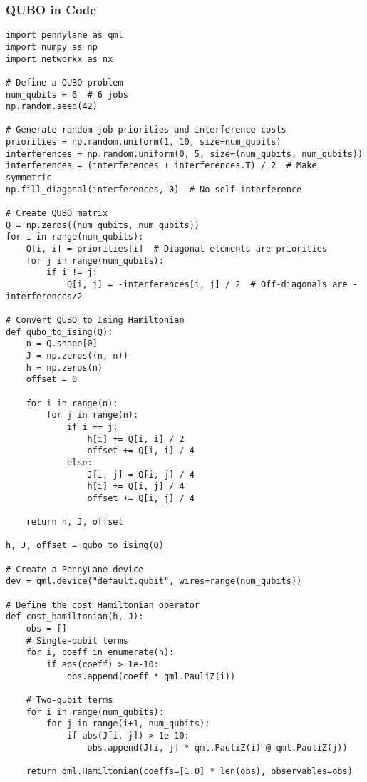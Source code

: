 \vspace{0.3cm}

\subsubsection*{QUBO in Code}

\begin{verbatim}
import pennylane as qml
import numpy as np
import networkx as nx

# Define a QUBO problem
num_qubits = 6  # 6 jobs
np.random.seed(42)

# Generate random job priorities and interference costs
priorities = np.random.uniform(1, 10, size=num_qubits)
interferences = np.random.uniform(0, 5, size=(num_qubits, num_qubits))
interferences = (interferences + interferences.T) / 2  # Make symmetric
np.fill_diagonal(interferences, 0)  # No self-interference

# Create QUBO matrix
Q = np.zeros((num_qubits, num_qubits))
for i in range(num_qubits):
    Q[i, i] = priorities[i]  # Diagonal elements are priorities
    for j in range(num_qubits):
        if i != j:
            Q[i, j] = -interferences[i, j] / 2  # Off-diagonals are -interferences/2

# Convert QUBO to Ising Hamiltonian
def qubo_to_ising(Q):
    n = Q.shape[0]
    J = np.zeros((n, n))
    h = np.zeros(n)
    offset = 0

    for i in range(n):
        for j in range(n):
            if i == j:
                h[i] += Q[i, i] / 2
                offset += Q[i, i] / 4
            else:
                J[i, j] = Q[i, j] / 4
                h[i] += Q[i, j] / 4
                offset += Q[i, j] / 4

    return h, J, offset

h, J, offset = qubo_to_ising(Q)

# Create a PennyLane device
dev = qml.device("default.qubit", wires=range(num_qubits))

# Define the cost Hamiltonian operator
def cost_hamiltonian(h, J):
    obs = []
    # Single-qubit terms
    for i, coeff in enumerate(h):
        if abs(coeff) > 1e-10:
            obs.append(coeff * qml.PauliZ(i))

    # Two-qubit terms
    for i in range(num_qubits):
        for j in range(i+1, num_qubits):
            if abs(J[i, j]) > 1e-10:
                obs.append(J[i, j] * qml.PauliZ(i) @ qml.PauliZ(j))

    return qml.Hamiltonian(coeffs=[1.0] * len(obs), observables=obs)


\end{verbatim}
